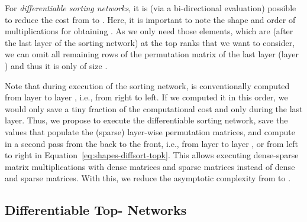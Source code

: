 \documentclass{article}
\begin{document}
For \textit{differentiable sorting networks}, it is (via a bi-directional evaluation) possible to reduce the cost from  to . 
Here, it is important to note the shape and order of multiplications for obtaining . 
As we only need those elements, which are (after the last layer of the sorting network) at the top  ranks that we want to consider, we can omit all remaining rows of the permutation matrix of the last layer (layer ) and thus it is only of size .

Note that during execution of the sorting network,  is conventionally computed from layer  to layer , i.e., from right to left.
If we computed it in this order, we would only save a tiny fraction of the computational cost and only during the last layer.
Thus, we propose to execute the differentiable sorting network, save the values that populate the (sparse)  layer-wise permutation matrices, and compute  in a second pass from the back to the front, i.e., from layer  to layer , or from left to right in Equation~\ref{eq:shapes-diffsort-topk}.
This allows executing  dense-sparse matrix multiplications with dense  matrices and sparse  matrices instead of dense  and sparse  matrices. 
With this, we reduce the asymptotic complexity from  to .
 




\subsection{Differentiable Top- Networks}
\end{document}
